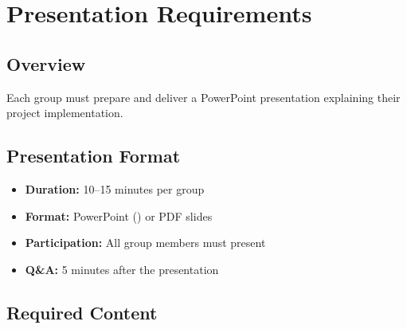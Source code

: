 
\section{Presentation Requirements}

\subsection{Overview}

Each group must prepare and deliver a PowerPoint presentation explaining their project implementation.

\subsection{Presentation Format}

\begin{itemize}
  \item \textbf{Duration:} 10--15 minutes per group
  \item \textbf{Format:} PowerPoint () or PDF slides
  \item \textbf{Participation:} All group members must present
  \item \textbf{Q\&A:} 5 minutes after the presentation
\end{itemize}

\subsection{Required Content}

